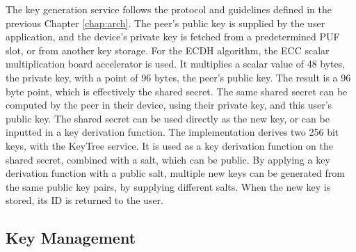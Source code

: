 The key generation service follows the protocol and guidelines defined in the previous Chapter \ref{chap:arch}.
The peer's public key is supplied by the user application, and the device's private key is fetched from a predetermined PUF slot, or from another key storage.
For the ECDH algorithm, the ECC scalar multiplication board accelerator is used. It multiplies a scalar value of 48 bytes, the private key, with a point of 96 bytes, the peer's public key. The result is a 96 byte point, which is effectively the shared secret. The same shared secret can be computed by the peer in their device, using their private key, and this user's public key.
The shared secret can be used directly as the new key, or can be inputted in a key derivation function.
The implementation derives two 256 bit keys, with the KeyTree service. It is used as a key derivation function on the shared secret, combined with a salt, which can be public.
By applying a key derivation function with a public salt, multiple new keys can be generated from the same public key pairs, by supplying different salts. 
When the new key is stored, its ID is returned to the user.

\subsection{Key Management}\label{chap:implementation:services:key-import}


